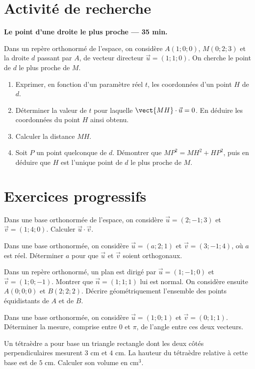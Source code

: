 \section{Activité de recherche}\textbf{Le point d'une droite le plus proche --- 35 min.}\par Dans un repère orthonormé de l'espace, on considère $A(1;0;0)$, $M(0;2;3)$ et la droite $d$ passant par $A$, de vecteur directeur $\vec u=(1;1;0)$. On cherche le point de $d$ le plus proche de $M$.
\begin{enumerate}\item Exprimer, en fonction d'un paramètre réel $t$, les coordonnées d'un point $H$ de $d$.
\item Déterminer la valeur de $t$ pour laquelle $\vect{MH}\cdot\vec u=0$. En déduire les coordonnées du point $H$ ainsi obtenu.
\item Calculer la distance $MH$.
\item Soit $P$ un point quelconque de $d$. Démontrer que $MP^2=MH^2+HP^2$, puis en déduire que $H$ est l'unique point de $d$ le plus proche de $M$.\end{enumerate}

\section{Exercices progressifs}

Dans une base orthonormée de l'espace, on considère $\vec u=(2;-1;3)$ et $\vec v=(1;4;0)$. Calculer $\vec u\cdot\vec v$.

Dans une base orthonormée, on considère $\vec u=(a;2;1)$ et $\vec v=(3;-1;4)$, où $a$ est réel. Déterminer $a$ pour que $\vec u$ et $\vec v$ soient orthogonaux.

Dans un repère orthonormé, un plan est dirigé par $\vec u=(1;-1;0)$ et $\vec v=(1;0;-1)$. Montrer que $\vec n=(1;1;1)$ lui est normal. On considère ensuite $A(0;0;0)$ et $B(2;2;2)$. Décrire géométriquement l'ensemble des points équidistants de $A$ et de $B$.

Dans une base orthonormée, on considère $\vec u=(1;0;1)$ et $\vec v=(0;1;1)$. Déterminer la mesure, comprise entre $0$ et $\pi$, de l'angle entre ces deux vecteurs.

Un tétraèdre a pour base un triangle rectangle dont les deux côtés perpendiculaires mesurent $3$ cm et $4$ cm. La hauteur du tétraèdre relative à cette base est de $5$ cm. Calculer son volume en $\mathrm{cm}^3$.

